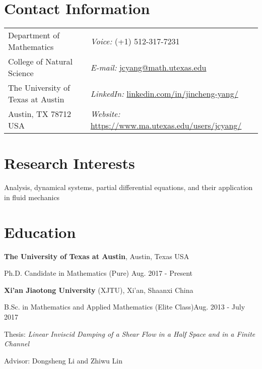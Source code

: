 \documentclass[margin,line]{res}
\newenvironment{list1}{
  \begin{list}{\ding{113}}{%
      \setlength{\itemsep}{0in}
      \setlength{\parsep}{0in} \setlength{\parskip}{0in}
      \setlength{\topsep}{0in} \setlength{\partopsep}{0in} 
      \setlength{\leftmargin}{0.17in}}}{\end{list}}
\begin{document}

\begin{resume}

\section{\sc Contact Information}
\begin{tabular}{@{}p{2.7in}p{3.05in}}        
Department of Mathematics & {\it Voice:}    (+1) 512-317-7231 \\
College of Natural Science & {\it E-mail:} \href{mailto:jcyang@math.utexas.edu}{\sf jcyang@math.utexas.edu}\\
The University of Texas at Austin & {\it LinkedIn:} \href{https://www.linkedin.com/in/jincheng-yang/}{\sf linkedin.com/in/jincheng-yang/}\\
Austin, TX 78712 USA & {\it Website:} \href{https://www.ma.utexas.edu/users/jcyang/}{\sf https://www.ma.utexas.edu/users/jcyang/}\\
\end{tabular}


\section{\sc Research Interests}
Analysis, dynamical systems, partial differential equations, and their application in fluid mechanics
\bigskip

\section{\sc Education}

{\bf The University of Texas at Austin}, Austin, Texas USA\\
\vspace*{-.1in}
\begin{list1}
\item[] Ph.D. Candidate in Mathematics (Pure) \hfill Aug. 2017 - Present
\end{list1}

{\bf Xi'an Jiaotong University} (XJTU), Xi'an, Shaanxi China\\
\vspace*{-.1in}
\begin{list1}
\item[] B.Sc. in Mathematics and Applied Mathematics (Elite Class)\hfill Aug. 2013 - July 2017
\item[] Thesis: \textit{Linear Inviscid Damping of a Shear Flow in a Half Space and in a Finite Channel}
\item[] Advisor: Dongsheng Li and Zhiwu Lin
\end{list1}


\end{resume}
\end{document}
